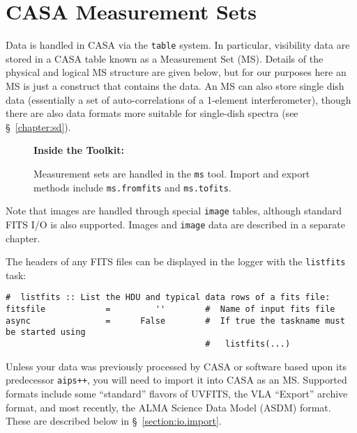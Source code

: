 \section{CASA Measurement Sets}
\label{section:io.ms}

Data is handled in CASA via the {\tt table} system.  In particular,
visibility data are stored in a CASA table known as a Measurement Set
(MS).  Details of the physical and logical MS structure are given
below, but for our purposes here an MS is just a construct that
contains the data.  An MS can also store single dish data (essentially
a set of auto-correlations of a 1-element interferometer), though
there are also data formats more suitable for single-dish spectra (see
\S~\ref{chapter:sd}).

\begin{wrapfigure}{r}{2.5in}
  \begin{boxedminipage}{2.5in}
     \centerline{\bf Inside the Toolkit:}
     Measurement sets are handled in the {\tt ms} tool.
     Import and export methods include {\tt ms.fromfits} and
     {\tt ms.tofits}.
  \end{boxedminipage}
\end{wrapfigure}

Note that images are handled through special
{\tt image} tables, although standard FITS I/O is also supported.
Images and {\tt image} data are described in a separate chapter.

The headers of any FITS files can be displayed in the logger with the
{\tt listfits} task:

\small
\begin{verbatim}
#  listfits :: List the HDU and typical data rows of a fits file:
fitsfile            =         ''        #  Name of input fits file
async               =      False        #  If true the taskname must be started using
                                        #   listfits(...)
\end{verbatim}
\normalsize

Unless your data was previously processed by CASA or software based
upon its predecessor {\tt aips++}, you will need to import it into
CASA as an MS.  Supported formats include some ``standard'' flavors
of UVFITS, the VLA ``Export'' archive format, and most recently,
the ALMA Science Data Model (ASDM) format.  These are described below
in \S~\ref{section:io.import}.

